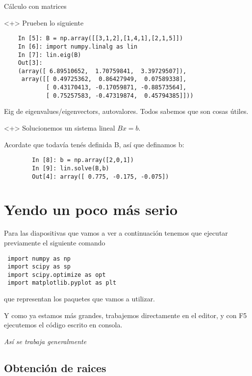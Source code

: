 \documentclass{beamer}
\begin{document}
\begin{frame}[fragile]{Cálculo con matrices}
    
    \begin{onlyenv}<+>
    Prueben lo siguiente
    \begin{verbatim}
    In [5]: B = np.array([[3,1,2],[1,4,1],[2,1,5]])
    In [6]: import numpy.linalg as lin
    In [7]: lin.eig(B)
    Out[3]: 
    (array([ 6.89510652,  1.70759841,  3.39729507]),
     array([[ 0.49725362,  0.86427949,  0.07589338],
            [ 0.43170413, -0.17059871, -0.88573564],
            [ 0.75257583, -0.47319874,  0.45794385]]))
    \end{verbatim}
    Eig de eigenvalues/eigenvectors, autovalores. Todos sabemos que son cosas útiles.
    \end{onlyenv}
    \begin{onlyenv}<+>
    Solucionemos un sistema lineal $Bx=b$.
    
    Acordate que todavía tenés definida B, así que definamos b:
    
    \begin{verbatim}
        In [8]: b = np.array([2,0,1])
        In [9]: lin.solve(B,b)
        Out[4]: array([ 0.775, -0.175, -0.075])
    \end{verbatim}
    
    \end{onlyenv}
    
\end{frame}


\section{Yendo un poco más serio}
\begin{frame}[fragile]{}
 Para las diapositivas que vamos a ver a continuación tenemos que ejecutar previamente el siguiente comando
 \begin{verbatim}
 import numpy as np
 import scipy as sp
 import scipy.optimize as opt
 import matplotlib.pyplot as plt
 \end{verbatim}
 que representan los paquetes que vamos a utilizar. 
 
 Y como ya estamos más grandes, trabajemos directamente en el editor, y con F5 ejecutemos el código escrito en consola. 
 
 \emph{Así se trabaja generalmente}
\end{frame}

\subsection{Obtención de raices}
\end{document}

